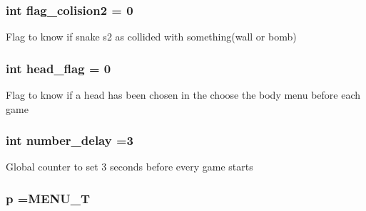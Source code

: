 \subsubsection[{\texorpdfstring{flag\+\_\+colision2}{flag_colision2}}]{\setlength{\rightskip}{0pt plus 5cm}int flag\+\_\+colision2 = 0\hspace{0.3cm}{\ttfamily [static]}}\hypertarget{group__man__events_ga85f22d2e2394a6cf3a343f1140068ea4}{}\label{group__man__events_ga85f22d2e2394a6cf3a343f1140068ea4}
Flag to know if snake s2 as collided with something(wall or bomb) 
\subsubsection[{\texorpdfstring{head\+\_\+flag}{head_flag}}]{\setlength{\rightskip}{0pt plus 5cm}int head\+\_\+flag = 0\hspace{0.3cm}{\ttfamily [static]}}\hypertarget{group__man__events_ga2112e7f4b28f5bc73cc834ef6e7d97e1}{}\label{group__man__events_ga2112e7f4b28f5bc73cc834ef6e7d97e1}
Flag to know if a head has been chosen in the choose the body menu before each game 
\subsubsection[{\texorpdfstring{number\+\_\+delay}{number_delay}}]{\setlength{\rightskip}{0pt plus 5cm}int number\+\_\+delay =3\hspace{0.3cm}{\ttfamily [static]}}\hypertarget{group__man__events_ga49dac5534222e1641ae32eba8e7baf8e}{}\label{group__man__events_ga49dac5534222e1641ae32eba8e7baf8e}
Global counter to set 3 seconds before every game starts 
\subsubsection[{\texorpdfstring{p}{p}}]{ p ={\bf M\+E\+N\+U\+\_\+T}\hspace{0.3cm}{\ttfamily [static]}}\hypertarget{group__man__events_ga70c7b8b5ec6a67ce08a8b74a970b88fa}{}\label{group__man__events_ga70c7b8b5ec6a67ce08a8b74a970b88fa}
